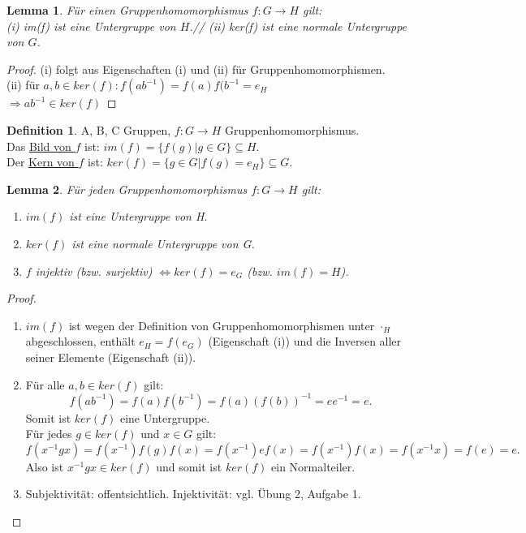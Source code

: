 \documentclass[12pt]{scrartcl}%
\newtheorem{lemma}{Lemma}
\theoremstyle{definition}
\newtheorem*{defn}{Definition}
\theoremstyle{remark}
\begin{document}
\begin{lemma}
F{\"u}r einen Gruppenhomomorphismus $f: G \rightarrow H$ gilt:\\
(i) im(f) ist eine Untergruppe von $H$.//
(ii) ker(f) ist eine normale Untergruppe von $G$.
\end{lemma}

\begin{proof}
(i) folgt aus Eigenschaften (i) und (ii) für Gruppenhomomorphismen.\\
(ii) f{\"u}r $a,b \in ker(f): f(ab^{-1})=f(a)f(b^{-1}=e_H$\\
$\Rightarrow ab^{-1} \in ker(f)$
\end{proof}

\newpage





\begin{defn}
	A, B, C Gruppen, $ f: G \rightarrow H$ Gruppenhomomorphismus. \\
	Das \underline{Bild von $f$} ist: $im(f) = \{f(g) | g \in G\} \subseteq H$. \\
	Der \underline{Kern von $f$} ist: $ker(f) = \{g \in G | f(g) = e_H\} \subseteq G$.
\end{defn}

\begin{lemma}
	Für jeden Gruppenhomomorphismus $ f: G \rightarrow H$ gilt:
	\begin{enumerate}[label=(\roman*)]
		\item $im(f)$ ist eine Untergruppe von H.
		\item $ker(f)$ ist eine normale Untergruppe von G.
		\item $f$ injektiv (bzw. surjektiv) $ \Leftrightarrow ker(f) = {e_G}$ (bzw. $im(f) = H$).
	\end{enumerate}
\end{lemma}

\begin{proof}
	\begin{enumerate}[label=(\roman*)]
		\item $im(f)$ ist wegen der Definition von Gruppenhomomorphismen unter $\cdot_H$ abgeschlossen, enthält $e_H = f(e_G)$ (Eigenschaft (i)) und die Inversen aller seiner Elemente (Eigenschaft (ii)).
		\item Für alle $a, b \in ker(f)$ gilt:
			$$ f(ab^{-1}) = f(a)f(b^{-1}) = f(a)(f(b))^{-1} = ee^{-1} = e.$$
			Somit ist $ker(f)$ eine Untergruppe. \\
			Für jedes $ g \in ker(f)$ und $x \in G$ gilt:
			$$ f(x^{-1}gx) = f(x^{-1})f(g)f(x) = f(x^{-1}) e f(x) = f(x^{-1})f(x) = f(x^{-1}x) = f(e) = e.$$
			Also ist $x^{-1}gx \in ker(f) $ und somit ist $ker(f)$ ein Normalteiler.
		\item Subjektivität: offentsichtlich. Injektivität: vgl. Übung 2, Aufgabe 1.
	\end{enumerate}	
\end{proof}
\end{document}
